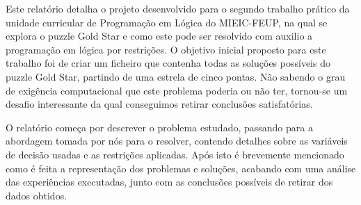 
Este relatório detalha o projeto desenvolvido para o segundo trabalho prático da unidade curricular de Programação em Lógica do MIEIC-FEUP, na qual se explora o puzzle Gold Star e como este pode ser resolvido com auxilio a programação em lógica por restrições. O objetivo inicial proposto para este trabalho foi de criar um ficheiro que contenha todas as soluções possíveis do puzzle Gold Star, partindo de uma estrela de cinco pontas. Não sabendo o grau de exigência computacional que este problema poderia ou não ter, tornou-se um desafio interessante da qual conseguimos retirar conclusões satisfatórias.

O relatório começa por descrever o problema estudado, passando para a abordagem tomada por nós para o resolver, contendo detalhes sobre as variáveis de decisão usadas e as restrições aplicadas. Após isto é brevemente mencionado como é feita a representação dos problemas e soluções, acabando com uma análise das experiências executadas, junto com as conclusões possíveis de retirar dos dados obtidos.